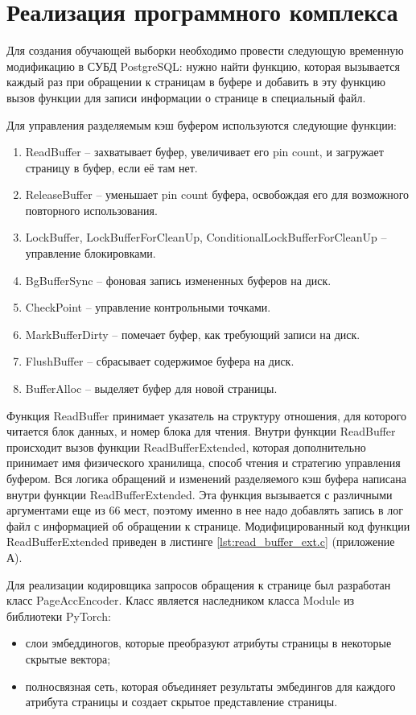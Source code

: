 \section{Реализация программного комплекса}

Для создания обучающей выборки необходимо провести следующую временную модификацию в СУБД PostgreSQL: нужно найти функцию, которая вызывается каждый раз при обращении к страницам в буфере и добавить в эту функцию вызов функции для записи информации о странице в специальный файл.

Для управления разделяемым кэш буфером используются следующие функции:
\begin{enumerate}
	\item ReadBuffer -- захватывает буфер, увеличивает его pin count, и загружает страницу в буфер, если её там нет.
	\item ReleaseBuffer -- уменьшает pin count буфера, освобождая его для возможного повторного использования.
	\item LockBuffer, LockBufferForCleanUp, ConditionalLockBufferForCleanUp -- управление блокировками.
	\item BgBufferSync -- фоновая запись измененных буферов на диск.
	\item CheckPoint -- управление контрольными точками.
	\item MarkBufferDirty -- помечает буфер, как требующий записи на диск.
	\item FlushBuffer -- сбрасывает содержимое буфера на диск.
	\item BufferAlloc -- выделяет буфер для новой страницы.
\end{enumerate}

Функция ReadBuffer принимает указатель на структуру отношения, для которого читается блок данных, и номер блока для чтения.
Внутри функции ReadBuffer происходит вызов функции ReadBufferExtended, которая дополнительно принимает имя физического хранилища, способ чтения и стратегию управления буфером.
Вся логика обращений и изменений разделяемого кэш буфера написана внутри функции ReadBufferExtended.
Эта функция вызывается с различными аргументами еще из 66 мест, поэтому именно в нее надо добавлять запись в лог файл с информацией об обращении к странице.
Модифицированный код функции ReadBufferExtended приведен в листинге \ref{lst:read_buffer_ext.c} (приложение А).

Для реализации кодировщика запросов обращения к странице был разработан класс PageAccEncoder.
Класс является наследником класса Module из библиотеки PyTorch:
\begin{itemize}
	\item слои эмбеддиногов, которые преобразуют атрибуты страницы в некоторые скрытые вектора;
	\item полносвязная сеть, которая объединяет результаты эмбедингов для каждого атрибута страницы и создает скрытое представление страницы.
\end{itemize}


